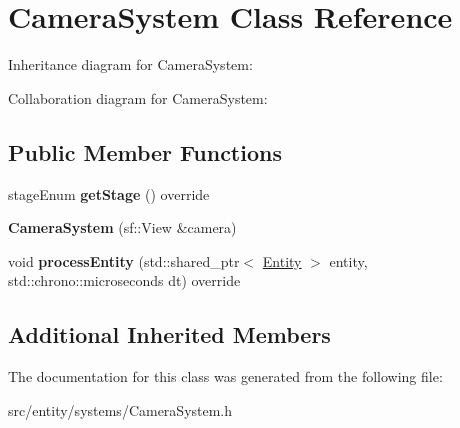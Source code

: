 \hypertarget{classCameraSystem}{\section{Camera\-System Class Reference}
\label{classCameraSystem}
}


Inheritance diagram for Camera\-System\-:


Collaboration diagram for Camera\-System\-:
\subsection*{Public Member Functions}
\begin{DoxyCompactItemize}
\item 
\hypertarget{classCameraSystem_abe46203a557de5eed55f33ac642824b4}{stage\-Enum {\bfseries get\-Stage} () override}\label{classCameraSystem_abe46203a557de5eed55f33ac642824b4}

\item 
\hypertarget{classCameraSystem_a1bd7eb1c192581c62dfc64479d8a232d}{{\bfseries Camera\-System} (sf\-::\-View \&camera)}\label{classCameraSystem_a1bd7eb1c192581c62dfc64479d8a232d}

\item 
\hypertarget{classCameraSystem_a09a5562a60158442222ff523b5e91426}{void {\bfseries process\-Entity} (std\-::shared\-\_\-ptr$<$ \hyperlink{classEntity}{Entity} $>$ entity, std\-::chrono\-::microseconds dt) override}\label{classCameraSystem_a09a5562a60158442222ff523b5e91426}

\end{DoxyCompactItemize}
\subsection*{Additional Inherited Members}


The documentation for this class was generated from the following file\-:\begin{DoxyCompactItemize}
\item 
src/entity/systems/Camera\-System.\-h\end{DoxyCompactItemize}
